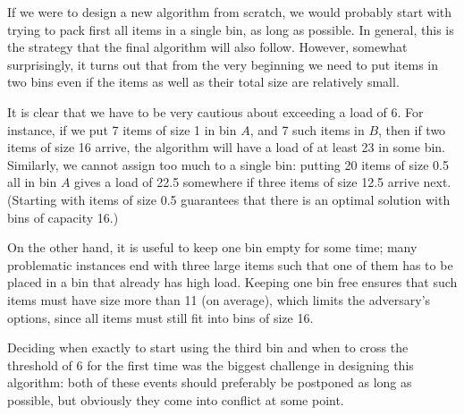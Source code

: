 If we were to design a new algorithm from scratch, we would probably
start with trying to pack first all items in a single bin, as long as
possible. In general, this is the strategy that the final algorithm
will also follow. However, somewhat surprisingly, it turns out that
from the very beginning we need to put items in two bins even if the
items as well as their total size are relatively small.

It is clear that we have to be very cautious about exceeding a load of
6. For instance, if we put 7 items of size 1 in bin $A$, and 7 such items in $B$,
then if two items of size 16 arrive, the algorithm will have a load of 
at least 23 in some bin. Similarly, we cannot assign too much to a single bin:
putting 20 items of size 0.5 all in bin $A$ gives a load of 22.5 somewhere if 
three items of size 12.5 arrive next. (Starting with items of size 0.5
guarantees that there is an optimal solution with bins of capacity 16.) 

On the other hand, it is useful to keep one bin empty for some time; many
problematic instances end with three large items such that one of them has
to be placed in a bin that already has high load. Keeping one bin free ensures
that such items must have size more than 11 (on average), which limits the
adversary's options, since all items must still fit into bins of size 16.

Deciding when exactly to start using the third bin and when to cross the
threshold of 6 for the first time was the biggest challenge in designing
this algorithm: both of these events should preferably be postponed as long
as possible, but obviously they come into conflict at some point.

